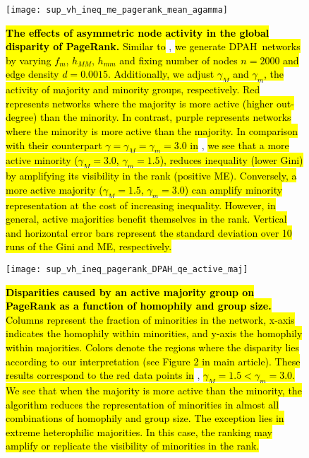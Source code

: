 \documentclass[fleqn,10pt]{wlscirep}
\begin{document}
\begin{figure}[ht]
    \centering
    \texttt{[image: sup\_vh\_ineq\_me\_pagerank\_mean\_agamma]}
    \caption{\hl{\textbf{The effects of asymmetric node activity in the global disparity of PageRank.} 
    Similar to} ,\hl{ we generate {DPAH}~networks by varying $f_m$, $h_{MM}$, $h_{mm}$ and fixing number of nodes $n=2000$ and edge density $d=0.0015$. Additionally, we adjust $\gamma_M$ and $\gamma_m$, the activity of majority and minority groups, respectively.
    Red represents networks where the majority is more active (higher out-degree) than the minority. 
    In contrast, purple represents networks where the minority is more active than the majority. 
    In comparison with their counterpart $\gamma=\gamma_M=\gamma_m=3.0$ in} , \hl{we see that a more active minority ($\gamma_M=3.0$, $\gamma_m=1.5$), reduces inequality (lower Gini) by amplifying its visibility in the rank (positive ME). Conversely, a more active majority ($\gamma_M=1.5$, $\gamma_m=3.0$) can amplify minority representation at the cost of increasing inequality. However, in general, active majorities benefit themselves in the rank. 
    Vertical and horizontal error bars represent the standard deviation over 10 runs of the Gini and ME, respectively.}}
    \label{sm:vh_pr_agamma}
\end{figure}

\begin{figure}[h!]
    \centering
    \texttt{[image: sup\_vh\_ineq\_pagerank\_DPAH\_qe\_active\_maj]}
    \caption{\hl{\textbf{Disparities caused by an active majority group on PageRank as a function of homophily and group size.} Columns represent the fraction of minorities in the network, x-axis indicates the homophily within minorities, and y-axis the homophily within majorities. 
    Colors denote the regions where the disparity lies according to our interpretation (see Figure 2 in main article).
    These results correspond to the red data points in} , \hl{$\gamma_M=1.5 < \gamma_m=3.0$. We see that when the majority is more active than the minority, the algorithm reduces the representation of minorities in almost all combinations of homophily and group size. The exception lies in extreme heterophilic majorities. In this case, the ranking may amplify or replicate the visibility of minorities in the rank.}}
    \label{sm:vh_pagerank_DBAH_active_maj}
\end{figure}
\end{document}
